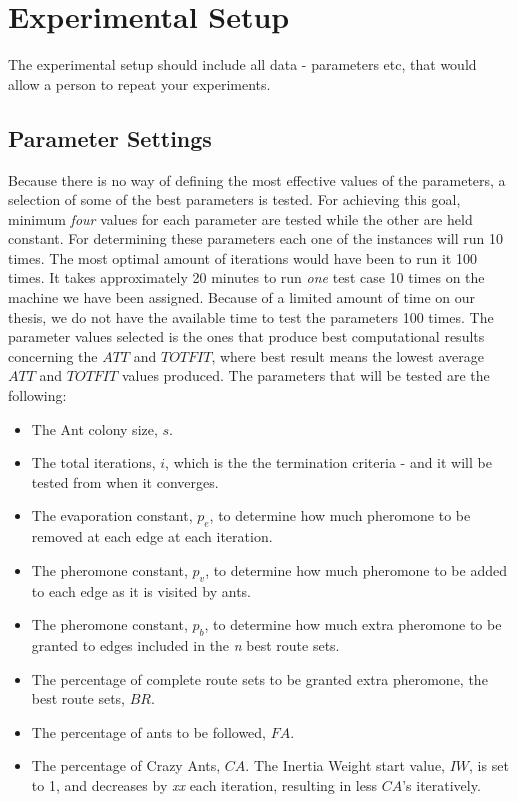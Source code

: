 \section{Experimental Setup}

The experimental setup should include all data - parameters etc, that would allow a person to repeat your experiments. 
 
\subsection{Parameter Settings}
\label{subsec:parameterSettings_setup}

Because there is no way of defining the most effective values of the parameters, a selection of some of the best parameters is tested. For achieving this goal, minimum \textit{four} values for each parameter are tested while the other are held constant. For determining these parameters each one of the instances will run 10 times. The most optimal amount of iterations would have been to run it 100 times. It takes approximately 20 minutes to run \textit{one} test case 10 times on the machine we have been assigned. Because of a limited amount of time on our thesis, we do not have the available time to test the parameters 100 times. The parameter values selected is the ones that produce best computational results concerning the $ATT$ and $TOTFIT$, where best result means the lowest average $ATT$ and $TOTFIT$ values produced. The parameters that will be tested are the following:

\begin{itemize}
\item The Ant colony size, $s$.
\item The total iterations, $i$, which is the the termination criteria - and it will be tested from when it converges. 
\item The evaporation constant, $p_{e}$, to determine how much pheromone to be removed at each edge at each iteration. 
\item The pheromone constant, $p_{v}$, to determine how much pheromone to be added to each edge as it is visited by ants. 
\item The pheromone constant, $p_{b}$, to determine how much extra pheromone to be granted to edges included in the \textit{n} best route sets.
\item The percentage of complete route sets to be granted extra pheromone, the best route sets, $BR$.
\item The percentage of ants to be followed, $FA$.
\item The percentage of Crazy Ants, $CA$. The Inertia Weight start value, $IW$, is set to 1, and decreases by \emph{\color{red}xx} each iteration, resulting in less $CA$'s iteratively.
\end{itemize}


